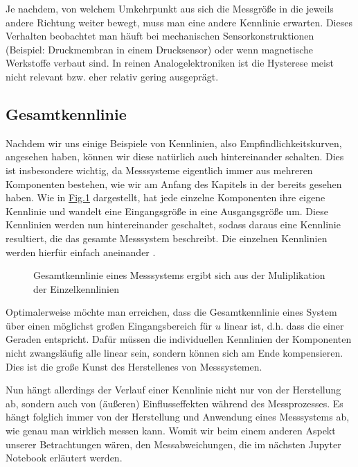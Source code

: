 \documentclass[letterpaper,10pt,english]{jupyterBook}
\let\sphinxpxdimen\pdfpxdimen\else\newdimen\sphinxpxdimen
\begin{document}
\sphinxAtStartPar
Je nachdem, von welchem Umkehrpunkt aus sich die Messgröße in die jeweils andere Richtung weiter bewegt, muss man eine andere Kennlinie erwarten. Dieses Verhalten beobachtet man häuft bei mechanischen Sensorkonstruktionen (Beispiel: Druckmembran in einem Drucksensor) oder wenn magnetische Werkstoffe verbaut sind. In reinen Analogelektroniken ist die Hysterese meist nicht relevant bzw. eher relativ gering ausgeprägt.


\subsection{Gesamtkennlinie}
\label{\detokenize{content/2_realeKennlinie:gesamtkennlinie}}
\sphinxAtStartPar
Nachdem wir uns einige Beispiele von Kennlinien, also Empfindlichkeitskurven, angesehen haben, können wir diese natürlich auch hintereinander schalten. Dies ist insbesondere wichtig, da Messsysteme eigentlich immer aus mehreren Komponenten bestehen, wie wir am Anfang des Kapitels in der  bereits gesehen haben.
Wie in \hyperref[\detokenize{content/2_realeKennlinie:id3}]{Fig.\@ \ref{\detokenize{content/2_realeKennlinie:id3}}} dargestellt, hat jede einzelne Komponenten ihre eigene Kennlinie und wandelt eine Eingangsgröße in eine Ausgangsgröße um.
Diese Kennlinien werden nun hintereinander geschaltet, sodass daraus eine Kennlinie resultiert, die das gesamte Messsystem beschreibt. Die einzelnen Kennlinien werden hierfür einfach aneinander .

\begin{figure}[htbp]
\centering
\capstart

\noindent\sphinxincludegraphics[width=600\sphinxpxdimen]{{gesamtkennlinie}.jpg}
\caption{Gesamtkennlinie eines Messsystems ergibt sich aus der Muliplikation der Einzelkennlinien}\label{\detokenize{content/2_realeKennlinie:id3}}\end{figure}

\sphinxAtStartPar
Optimalerweise möchte man erreichen, dass die Gesamtkennlinie eines System über einen möglichst großen Eingangsbereich für \(u\) linear ist, d.h. dass die einer Geraden entspricht. Dafür müssen die individuellen Kennlinien der Komponenten nicht zwangsläufig alle linear sein, sondern können sich am Ende kompensieren. Dies ist die große Kunst des Herstellenes von Messsystemen.

\sphinxAtStartPar
Nun hängt allerdings der Verlauf einer Kennlinie nicht nur von der Herstellung ab, sondern auch von (äußeren) Einflusseffekten während des Messprozesses. Es hängt folglich immer von der Herstellung und Anwendung eines Messsystems ab, wie genau man wirklich messen kann. Womit wir beim einem anderen Aspekt unserer Betrachtungen wären, den Messabweichungen, die im nächsten Jupyter Notebook erläutert werden.
\end{document}
